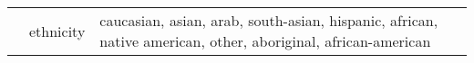 \documentclass[11pt,a4paper]{article}
\begin{document}
\begin{table*}[]
{\begin{tabular}{|l|l|l|}
                                                                                                       \\ \cline{2-3} 
                            & ethnicity & caucasian, asian, arab, south-asian, hispanic, african, native american, other, aboriginal, african-american                                                                                                                                                                                                                                                                                                                                                                                                                                                                                                                                                                                                                                                                                                                                                                                                                                                                                                                                                                                                                                                                                                                                                                                                                                                                                                                                                                                                                                                                                                                                                                                                                                                                                                                                                                                                                                                                                                                                                                                                                                                                                                                                                                                                                                                                                                                                                                                                                                                                                                                                                                                                                                                                                                                                                                                                                                                                                                                                                                                                                                                                                
\end{tabular}}
\end{table*}
\end{document}

